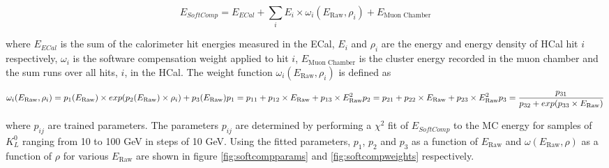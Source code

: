 \begin{equation}
E_{SoftComp} = E_{ECal} + \sum_{i} E_{i} \times \omega_{i}(E_{\text{Raw}}, \rho_{i}) + E_{\text{Muon Chamber}}
\label{equ:softcomp}
\end{equation}

where $E_{ECal}$ is the sum of the calorimeter hit energies measured in the ECal, $E_{i}$ and $\rho_{i}$ are the energy and energy density of HCal hit $i$ respectively, $\omega_{i}$ is the software compensation weight applied to hit $i$, $E_{\text{Muon Chamber}}$ is the cluster energy recorded in the muon chamber and the sum runs over all hits, $i$, in the HCal.  The weight function $\omega_{i}(E_{\text{Raw}}, \rho_{i})$ is defined as

\begin{equation}
\omega_{i}(E_{\text{Raw}}, \rho_{i}) = p_{1}(E_{\text{Raw}}) \times exp(p_{2}(E_{\text{Raw}}) \times \rho_{i}) + p_{3}(E_{\text{Raw}}) \\
p_{1} = p_{11} + p_{12} \times E_{\text{Raw}} + p_{13} \times E_{\text{Raw}}^{2} \\
p_{2} = p_{21} + p_{22} \times E_{\text{Raw}} + p_{23} \times E_{\text{Raw}}^{2} \\
p_{3} = \frac{p_{31}}{p_{32} + exp(p_{33} \times E_{\text{Raw}})}
\label{equ:softcompweight}
\end{equation}

where $p_{ij}$ are trained parameters.  The parameters $p_{ij}$ are determined by performing a $\chi^{2}$ fit of $E_{SoftComp}$ to the MC energy for samples of $K^{0}_{L}$ ranging from 10 to 100 GeV in steps of 10 GeV.  Using the fitted parameters, $p_{1}$,  $p_{2}$ and $p_{3}$ as a function of $E_{\text{Raw}}$ and $\omega(E_{\text{Raw}}, \rho)$ as a function of $\rho$ for various $E_{\text{Raw}}$ are shown in figure \ref{fig:softcompparams} and \ref{fig:softcompweights} respectively.  

